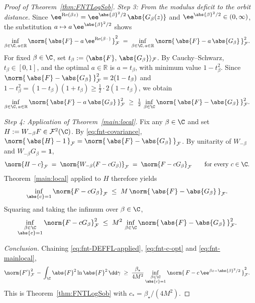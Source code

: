 \begin{proof}[Proof of Theorem~\ref{thm:FNTLogSob}]
\medskip
\noindent
\emph{Step 3: From the modulus deficit to the orbit distance.}\;
Since $\ee^{\operatorname{Re}(\beta z)}
= \ee^{\abs{\beta}^2/2}\, \abs{G_\beta(z)}$ and
$\ee^{\abs{\beta}^2/2} \in (0, \infty)$, the substitution
$a \mapsto a\, \ee^{\abs{\beta}^2/2}$ shows
\[
\inf_{\beta \in \C,\, a \in \mathbb{R}}
\norm{\, \abs{F} - a\, \ee^{\operatorname{Re}(\beta\,\cdot\,)} \,}_{\mathcal{F}}^2
\;=\;
\inf_{\beta \in \C,\, a \in \mathbb{R}}
\norm{\, \abs{F} - a\, \abs{G_\beta} \,}_{\mathcal{F}}^2.
\]
For fixed $\beta \in \C$, set $t_\beta := \langle \abs{F},\, \abs{G_\beta} \rangle_{\mathcal{F}}$.
By Cauchy--Schwarz, $t_\beta \in [0, 1]$, and the optimal $a \in \mathbb{R}$ is
$a = t_\beta$, with minimum value $1 - t_\beta^2$.  Since
$\norm{\, \abs{F} - \abs{G_\beta} \,}_{\mathcal{F}}^2 = 2(1 - t_\beta)$
and
$1 - t_\beta^2 = (1 - t_\beta)(1 + t_\beta) \ge \tfrac{1}{2}\cdot 2(1 - t_\beta)$,
we obtain
\begin{equation}\label{eq:fnt-c-opt}
\inf_{\beta \in \C,\, a \in \mathbb{R}}
\norm{\, \abs{F} - a\, \abs{G_\beta} \,}_{\mathcal{F}}^2
\;\ge\;
\tfrac{1}{2}\, \inf_{\beta \in \C}
\norm{\, \abs{F} - \abs{G_\beta} \,}_{\mathcal{F}}^2.
\end{equation}

\medskip
\noindent
\emph{Step 4: Application of Theorem~\ref{main:local}.}\;
Fix any $\beta \in \C$ and set $H := W_{-\beta} F \in \mathcal{F}^2(\C)$.
By \eqref{eq:fnt-covariance},
$\norm{\, \abs{H} - 1 \,}_{\mathcal{F}}
= \norm{\, \abs{F} - \abs{G_\beta} \,}_{\mathcal{F}}$.
By unitarity of $W_{-\beta}$ and $W_{-\beta} G_\beta = \mathbf{1}$,
\[
\norm{H - c}_{\mathcal{F}}
\;=\; \norm{W_{-\beta}(F - c G_\beta)}_{\mathcal{F}}
\;=\; \norm{F - c G_\beta}_{\mathcal{F}}
\qquad \text{for every } c \in \C.
\]
Theorem~\ref{main:local} applied to $H$ therefore yields
\[
\inf_{\abs{c}=1} \norm{F - c G_\beta}_{\mathcal{F}}
\;\le\; M\, \norm{\, \abs{F} - \abs{G_\beta} \,}_{\mathcal{F}}.
\]
Squaring and taking the infimum over $\beta \in \C$,
\begin{equation}\label{eq:fnt-mainlocal}
\inf_{\substack{\beta \in \C \\ \abs{c}=1}}
\norm{F - c G_\beta}_{\mathcal{F}}^2
\;\le\;
M^2\, \inf_{\beta \in \C}
\norm{\, \abs{F} - \abs{G_\beta} \,}_{\mathcal{F}}^2.
\end{equation}

\medskip
\noindent
\emph{Conclusion.}\;
Chaining \eqref{eq:fnt-DEFFL-applied}, \eqref{eq:fnt-c-opt} and
\eqref{eq:fnt-mainlocal},
\[
\norm{F'}_{\mathcal{F}}^2
\,-\, \int_{\C} \abs{F}^2 \ln \abs{F}^2\, \dd\gamma
\;\ge\;
\frac{\beta_\star}{4 M^2}
\inf_{\substack{\beta \in \C \\ \abs{c}=1}}
\norm{\, F - c\, \ee^{\beta z - \abs{\beta}^2/2} \,}_{\mathcal{F}}^2.
\]
This is Theorem~\ref{thm:FNTLogSob} with $c_\ast = \beta_\star/(4 M^2)$.
\end{proof}
